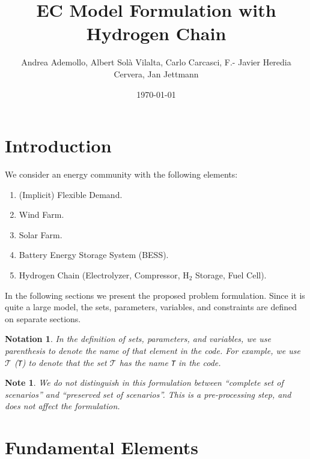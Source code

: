 \documentclass{article}
\title{EC Model Formulation with Hydrogen Chain}
\author{Andrea Ademollo, Albert Sol\`a Vilalta, Carlo Carcasci, F.- Javier Heredia Cervera, Jan Jettmann}
\date{\today}
\newtheorem{notation}{Notation}[section]
\newtheorem{note}{Note}[section]
\begin{document}
\maketitle

\section{Introduction}

We consider an energy community with the following elements:
\begin{enumerate}
	\item (Implicit) Flexible Demand.
	\item Wind Farm.
	\item Solar Farm.
	\item Battery Energy Storage System (BESS).
    \item Hydrogen Chain (Electrolyzer, Compressor, H$_2$ Storage, Fuel Cell).
\end{enumerate}

In the following sections we present the proposed problem formulation. Since it is quite a large model, the sets, parameters, variables, and constraints are defined on separate sections.

\begin{notation}
	In the definition of sets, parameters, and variables, we use parenthesis to denote the name of that element in the code. For example, we use $\mathcal{T}$ (\verb|T|) to denote that the set $\mathcal{T}$ has the name \verb|T| in the code.  
\end{notation}

\begin{note} \label{NOTE:ScenarioTreatment}
	We do not distinguish in this formulation between ``complete set of scenarios'' and ``preserved set of scenarios''. This is a pre-processing step, and does not affect the formulation. 
\end{note}

\section{Fundamental Elements}
\label{SEC:FundamentalElements}
\end{document}
